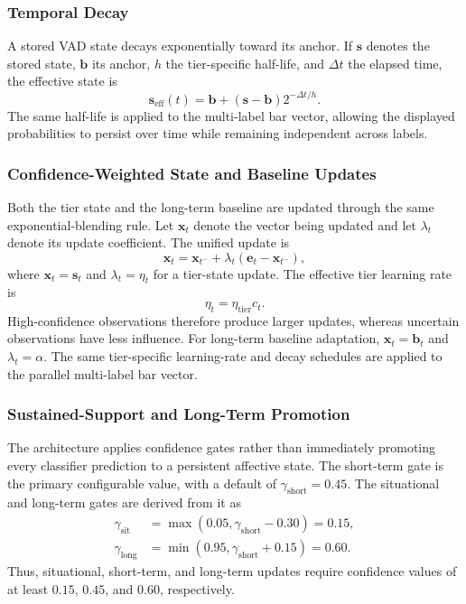 \documentclass[graybox]{svmult}
\begin{document}
\subsubsection{Temporal Decay}
A stored VAD state decays exponentially toward its anchor. If $\mathbf{s}$ denotes the stored state, $\mathbf{b}$ its anchor, $h$ the tier-specific half-life, and $\Delta t$ the elapsed time, the effective state is
\begin{equation}
\mathbf{s}_{\mathrm{eff}}(t)
=
\mathbf{b}
+
\left(\mathbf{s}-\mathbf{b}\right)
2^{-\Delta t/h}.
\label{eq:vad_decay}
\end{equation}
The same half-life is applied to the multi-label bar vector, allowing the displayed probabilities to persist over time while remaining independent across labels.

\subsubsection{Confidence-Weighted State and Baseline Updates}
Both the tier state and the long-term baseline are updated through the same
exponential-blending rule. Let $\mathbf{x}_t$ denote the vector being updated
and let $\lambda_t$ denote its update coefficient. The unified update is
\begin{equation}
\mathbf{x}_{t}
=
\mathbf{x}_{t^-}
+
\lambda_t
\left(
\mathbf{e}_t-\mathbf{x}_{t^-}
\right),
\label{eq:state_update}
\end{equation}
where $\mathbf{x}_t=\mathbf{s}_t$ and
$\lambda_t=\eta_t$ for a tier-state update. The effective tier learning rate is
\begin{equation}
\eta_t = \eta_{\mathrm{tier}}c_t.
\label{eq:effective_lr}
\end{equation}
High-confidence observations therefore produce larger updates, whereas
uncertain observations have less influence. For long-term baseline
adaptation, $\mathbf{x}_t=\mathbf{b}_t$ and $\lambda_t=\alpha$. The same
tier-specific learning-rate and decay schedules are applied to the parallel
multi-label bar vector.

\subsubsection{Sustained-Support and Long-Term Promotion}
\label{subsec:support}

The architecture applies confidence gates rather than immediately promoting
every classifier prediction to a persistent affective state. The short-term
gate is the primary configurable value, with a default of
$\gamma_{\mathrm{short}}=0.45$. The situational and long-term gates are derived
from it as
\begin{align}
\gamma_{\mathrm{sit}}
&=\max\!\left(0.05,\gamma_{\mathrm{short}}-0.30\right)=0.15,\\
\gamma_{\mathrm{long}}
&=\min\!\left(0.95,\gamma_{\mathrm{short}}+0.15\right)=0.60.
\label{eq:confidence_gates}
\end{align}
Thus, situational, short-term, and long-term updates require confidence values
of at least $0.15$, $0.45$, and $0.60$, respectively.
\end{document}
